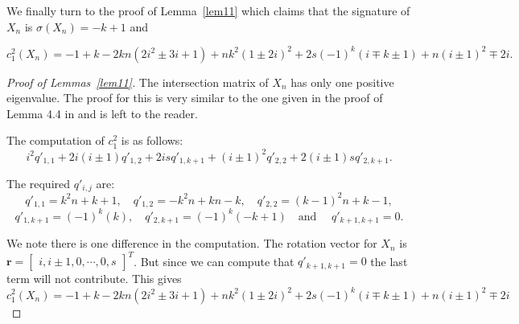 \documentclass[12pt]{amsart}
\theoremstyle{definition}
\theoremstyle{definition}
\begin{document}
		We finally turn to the proof of Lemma~\ref{lem11} which claims that the signature of $X_n$ is $\sigma(X_n)=-k+1$ and
	
		$$c_1^2(X_{n})=-1+k-2 k n \left(2 i^2\pm 3 i+1\right)+nk^2 (1\pm 2i)^2+2s (-1)^k (i\mp k\pm 1) +n (i\pm 1)^2\mp2 i.$$
		\begin{proof}[Proof of Lemmas~\ref{lem11}]
			
			
			The intersection matrix of $X_{n}$  has only one positive eigenvalue. The proof for this is very similar to the one given in the proof of Lemma 4.4 in \cite{ES} and is left to the reader.
			
			The computation of $c_1^2$ is as follows: 
			$$i^2 q'_{1,1} +2i(i\pm 1)q'_{1,2}+2isq'_{1,k+1}+ (i\pm 1)^2q'_{2,2}+ 2(i \pm 1)sq'_{2,k+1}.$$
			
			
			The required $q'_{i,j}$ are:		\[
			q'_{1,1}=k^2n+k+1, \quad q'_{1,2}=-k^2n+kn-k,  \quad q'_{2,2}=(k-1)^2n+k-1, \] \[  q'_{1,k+1}=(-1)^k(k),  \quad q'_{2,k+1}=(-1)^k(-k+1) \quad \text{and } \quad q'_{k+1, k+1}=0.\]
			
			We note there is one difference in the computation. The rotation vector for $X_{n}$ is $\mathbf{r}=\begin{bmatrix}i,i\pm 1, 0, \cdots, 0,s\end{bmatrix}^T$. But since we can compute that $q'_{k+1,k+1}=0$ the last term will not contribute. This gives  
			$$c_1^2(X_{n})=-1+k-2 k n \left(2 i^2\pm 3 i+1\right)+nk^2 (1\pm 2i)^2+2s (-1)^k (i\mp k\pm 1) +n (i\pm 1)^2\mp2 i$$
		\end{proof}
		


			
		
\end{document}
